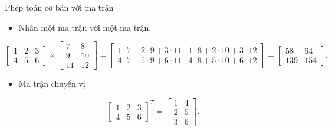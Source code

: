 \begin{frame}{Phép toán cơ bản với ma trận}
    \begin{itemize}
        \item Nhân một ma trận với một ma trận.
    \end{itemize}
    {\footnotesize
    \begin{equation}
        \left[ \begin{array}{ccc}
            1 & 2 & 3 \\
            4 & 5 & 6
        \end{array} \right]
        \times
        \left[ \begin{array}{cc}
            7 & 8 \\
            9 & 10 \\
            11 & 12
        \end{array} \right]
        =
        \left[ \begin{array}{cc}
            1 \cdot 7 + 2 \cdot 9 + 3 \cdot 11 & 1 \cdot 8 + 2 \cdot 10 + 3 \cdot 12 \\
            4 \cdot 7 + 5 \cdot 9 + 6 \cdot 11 & 4 \cdot 8 + 5 \cdot 10 + 6 \cdot 12
        \end{array} \right]
        =
        \left[ \begin{array}{cc}
            58 & 64 \\
            139 & 154
        \end{array} \right].
    \end{equation}  
    }
    \begin{itemize}
        \item Ma trận chuyển vị
    \end{itemize}
    \begin{equation}
        \left[ \begin{array}{ccc}
            1 & 2 & 3 \\
            4 & 5 & 6
        \end{array} \right]^T
        =
        \left[ \begin{array}{cc}
            1 & 4 \\
            2 & 5 \\
            3 & 6
        \end{array} \right].
    \end{equation}
\end{frame}